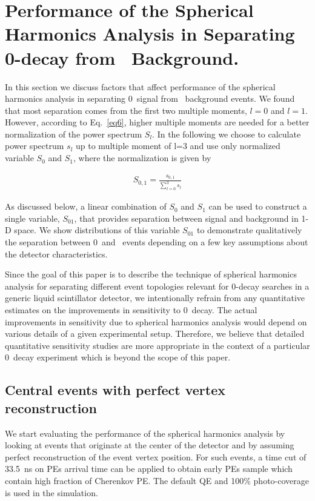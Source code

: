 \section{Performance of the Spherical Harmonics Analysis in Separating 0\nbb-decay from \B~Background.}
\label{sec:performance}

In this section we discuss factors that affect performance of the spherical harmonics analysis in separating
0\nbb~signal from \B~background events. We found that most separation comes from the first two multiple moments,
$l=0$ and $l=1$. However, according to Eq.~\ref{eq6}, higher multiple moments are needed for a better normalization of the 
power spectrum $S_l$. In the following we choose to calculate power spectrum $s_l$ up to multiple moment of l=3 and
use only normalized variable $S_0$ and $S_1$, where the normalization is given by

\begin{eqnarray}
\label{eq7}
S_{0,1} = \frac{s_{0,1}}{\sum_{l=0}^{3} s_l}
\end{eqnarray}

As discussed below, a linear combination of $S_0$ and $S_1$ can be used to construct a single variable, $S_{01}$, that provides 
separation between signal and background in 1-D space. We show distributions of this variable $S_{01}$ to demonstrate qualitatively 
the separation between 0\nbb~and \B~events depending on a few key assumptions about the detector characteristics.

Since the goal of this paper is to describe the technique of spherical harmonics analysis for separating
different event topologies relevant for 0\nbb-decay searches in a generic liquid scintillator detector, we intentionally refrain from any 
quantitative estimates on the improvements in sensitivity to 0\nbb~decay. The actual improvements in sensitivity due to spherical 
harmonics analysis would depend on various details of a given experimental setup. Therefore, we believe that detailed quantitative 
sensitivity studies are more appropriate in the context of a particular 0\nbb~decay experiment which is beyond the scope of this paper.

\subsection{Central events with perfect vertex reconstruction}

We start evaluating the performance of the spherical harmonics analysis by looking at events that originate at the center
of the detector and by assuming perfect reconstruction of the event vertex position. For such events, a time cut of 33.5~ns on PEs 
arrival time can be applied to obtain early PEs sample which contain high fraction of Cherenkov PE. The default QE and 100\% 
photo-coverage is used in the simulation.

